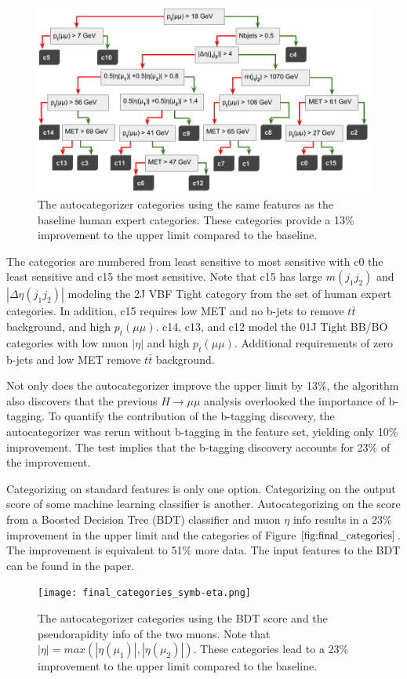 \documentclass[review]{elsarticle}
\begin{document}
\begin{figure}[h!]
  \centering
  \includegraphics[width=0.98\linewidth]{autocat_categories.png}
  \caption
  {The autocategorizer categories using the same features as the baseline human expert categories. These categories provide a 13\% improvement to the upper limit compared to the baseline.}
  \label{fig:autocats}
\end{figure}
The categories are numbered from least sensitive to most sensitive with c0 the least sensitive and c15 the most sensitive. Note that c15 has large $m(j_1j_2)$ and $|\Delta\eta(j_1j_2)|$ modeling the 2J VBF Tight category from the set of human expert categories. In addition, c15 requires low MET and no b-jets to remove $t\bar{t}$ background, and high $p_t(\mu\mu)$.
c14, c13, and c12 model the 01J Tight BB/BO categories with low muon $|\eta|$ and high $p_t(\mu\mu)$. Additional requirements of zero b-jets and low MET remove $t\bar{t}$ background. 
\FloatBarrier

Not only does the autocategorizer improve the upper limit by 13\%, the algorithm also discovers that the previous $H\rightarrow\mu\mu$ analysis overlooked the importance of b-tagging. To quantify the contribution of the b-tagging discovery, the autocategorizer was rerun without b-tagging in the feature set, yielding only 10\% improvement. The test implies that the b-tagging discovery accounts for 23\% of the improvement. 

Categorizing on standard features is only one option. Categorizing on the output score of some machine learning classifier is another. Autocategorizing on the score from a Boosted Decision Tree (BDT) classifier and muon $\eta$ info results in a 23\% improvement in the upper limit and the categories of Figure $\ref{fig:final_categories}$. The improvement is equivalent to 51\% more data. The input features to the BDT can be found in the paper.
\begin{figure}[h!]
  \centering
  \texttt{[image: final\_categories\_symb-eta.png]}
  \caption
  {The autocategorizer categories using the BDT score and the pseudorapidity info of the two muons. Note that $|\eta| = max(|\eta(\mu_1)|,|\eta(\mu_2)|)$. These categories lead to a 23\% improvement to the upper limit compared to the baseline.}
  \label{fig:final_categories}
\end{figure}
\FloatBarrier
\end{document}
